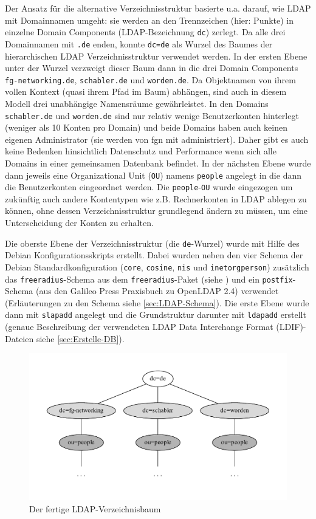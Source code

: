 \documentclass[11pt,a4paper,titlepage=firstiscover,headsepline,bibtotoc]{scrartcl} %
\begin{document}
Der Ansatz für die alternative Verzeichnisstruktur basierte u.a. darauf, wie LDAP mit Domainnamen umgeht: sie werden an den Trennzeichen (hier: Punkte) in einzelne Domain Components (LDAP-Bezeichnung \texttt{dc}) zerlegt. Da alle drei Domainnamen mit \texttt{.de} enden, konnte \texttt{dc=de} als Wurzel des Baumes der hierarchischen LDAP Verzeichnisstruktur verwendet werden. In der ersten Ebene unter der Wurzel verzweigt dieser Baum dann in die drei Domain Components  \texttt{fg-networking.de}, \texttt{schabler.de} und \texttt{worden.de}. Da Objektnamen von ihrem vollen Kontext (quasi ihrem Pfad im Baum) abhängen, sind auch in diesem Modell drei unabhängige Namensräume gewährleistet. In den Domains \texttt{schabler.de} und \texttt{worden.de} sind nur relativ wenige Benutzerkonten hinterlegt (weniger als 10 Konten pro Domain) und beide Domains haben auch keinen eigenen Administrator (sie werden von fgn mit administriert). Daher gibt es auch keine Bedenken hinsichtlich Datenschutz und Performance wenn sich alle Domains in einer gemeinsamen Datenbank befindet. In der nächsten Ebene wurde dann jeweils eine Organizational Unit (\texttt{OU}) namens \texttt{people} angelegt in die dann die Benutzerkonten eingeordnet werden. Die \texttt{people}-\texttt{OU} wurde eingezogen um zukünftig auch andere Kontentypen wie z.B. Rechnerkonten in LDAP ablegen zu können, ohne dessen Verzeichnisstruktur grundlegend ändern zu müssen, um eine Unterscheidung der Konten zu erhalten.

Die oberste Ebene der Verzeichnisstruktur (die \texttt{de}-Wurzel) wurde mit Hilfe des Debian Konfigurationsskripts erstellt. Dabei wurden neben den vier Schema der Debian Standardkonfiguration (\texttt{core}, \texttt{cosine}, \texttt{nis} und \texttt{inetorgperson}) zusätzlich das \texttt{freeradius}-Schema aus dem \texttt{freeradius}-Paket (siehe ) und ein \texttt{postfix}-Schema (aus den Galileo Press Praxisbuch zu OpenLDAP 2.4) verwendet (Erläuterungen zu den Schema siehe \autoref{sec:LDAP-Schema}). Die erste Ebene wurde dann mit \texttt{slapadd} angelegt und die Grundstruktur darunter mit \texttt{ldapadd} erstellt (genaue Beschreibung der verwendeten LDAP Data Interchange Format (LDIF)-Dateien siehe \autoref{sec:Erstelle-DB}).

\begin{figure}[htbp] 
\centering
\includegraphics[width=\textwidth]{Bilder/LDAP-fgn.pdf}
\caption{Der fertige LDAP-Verzeichnisbaum}
\label{fig:LDAP-Baum}
\end{figure}
\end{document}

